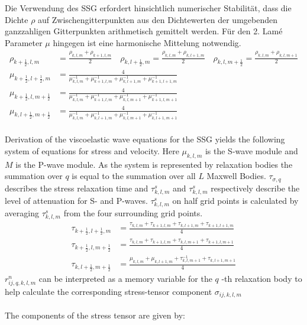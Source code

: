 \documentclass[pdftex,a4paper,parskip,listof=totoc,bibliography=totoc,onehalfspacing,12pt]{scrreprt}
\begin{document}
Die Verwendung des SSG erfordert hinsichtlich numerischer Stabilität, dass die Dichte $\rho$ auf Zwischengitterpunkten aus den Dichtewerten der umgebenden ganzzahligen Gitterpunkten arithmetisch gemittelt werden. Für den 2. Lamé Parameter $\mu$ hingegen ist eine harmonische Mittelung notwendig.
\begin{align*}
	\rho_{k+\frac{1}{2},l,m} &= \frac{\rho_{k,l,m} + \rho_{k+1,l,m}}{2} \quad \rho_{k,l+\frac{1}{2},m} = \frac{\rho_{k,l,m} + \rho_{k,l+1,m}}{2} \quad \rho_{k,l,m+\frac{1}{2}} = \frac{\rho_{k,l,m} + \rho_{k,l,m+1}}{2}\\
	\mu_{k+\frac{1}{2},l+\frac{1}{2},m} &= \frac{4}{\mu^{-1}_{k,l,m} + \mu^{-1}_{k+1,l,m} + \mu^{-1}_{k,l+1,m} + \mu^{-1}_{k+1,l+1,m}}\\
	\mu_{k+\frac{1}{2},l,m+\frac{1}{2}} &= \frac{4}{\mu^{-1}_{k,l,m} + \mu^{-1}_{k+1,l,m} + \mu^{-1}_{k,l,m+1} + \mu^{-1}_{k+1,l,m+1}}\\
	\mu_{k,l+\frac{1}{2},m+\frac{1}{2}} &= \frac{4}{\mu^{-1}_{k,l,m} + \mu^{-1}_{k,l+1,m} + \mu^{-1}_{k,l,m+1} + \mu^{-1}_{k,l+1,m+1}}
\end{align*}
\\
Derivation of the viscoelastic wave equations for the SSG yields the following system of equations for stress and velocity. Here $\mu_{k,l,m}$ is the S-wave module and $M$ is the P-wave module. As the system is represented by relaxation bodies the summation over $q$ is equal to the summation over all $L$ Maxwell Bodies. $\tau_{\sigma,q}$ describes the stress relaxation time and $\tau_{k,l,m}^s$ and $\tau_{k,l,m}^s$ respectively describe the level of attenuation for S- and P-waves. $\tau_{k,l,m}^s$ on half grid points is calculated by averaging $\tau_{k,l,m}^s$  from the four surrounding grid points. 
\begin{align*}
	\tau_{k+\frac{1}{2},l+\frac{1}{2},m} &= \frac{\tau_{k,l,m} + \tau_{k+1,l,m} + \tau_{k,l+1,m} + \tau_{k+1,l+1,m}}{4}\\
	\tau_{k+\frac{1}{2},l,m+\frac{1}{2}} &= \frac{\tau_{k,l,m} + \tau_{k+1,l,m} + \tau_{k,l,m+1} + \tau_{k+1,l,m+1}}{4}\\
	\tau_{k,l+\frac{1}{2},m+\frac{1}{2}} &= \frac{\mu_{k,l,m} + \mu_{k,l+1,m} + \tau^{-1}_{k,l,m+1} + \tau_{k,l+1,m+1}}{4}
\end{align*}
$r_{ij,q,k,l,m}^{n}$ can be interpreted as a memory variable for the $q$ -th relaxation body to help calculate the corresponding stress-tensor component $\sigma_{ij,k,l,m}$
\\\\The components of the stress tensor are given by:\\
\end{document}
